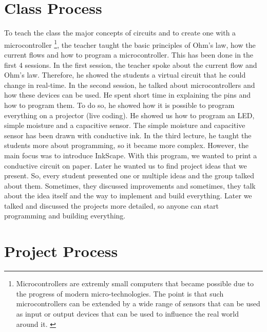 \documentclass[12pt,twoside,a4paper]{article}
\begin{document}
    \section{Class Process}
    \begin{flushleft}
        To teach the class the major concepts of circuits and to create one with a microcontroller {\footnote{\label{foot:
        microcontroller} Microcontrollers are extremly small computers that became possible due to the progress of modern 
        micro-technologies. The point is that such microcontrollers can be extended by a wide range of sensors that can 
        be used as input or output devices that can be used to influence the real world around it. \cite{Schief1997, 
        Dembowski2014}}}, the teacher taught the basic principles of Ohm's law, how the current flows and how to program 
        a microcontroller. This has been done in the first 4 sessions.\newline
        In the first session, the teacher spoke about the current flow and Ohm's law. Therefore, he showed the students
        a virtual circuit that he could change in real-time.\newline
        In the second session, he talked about microcontrollers and how these devices can be used. He spent short
        time in explaining the pins and how to program them. To do so, he showed how it is possible to program
        everything on a projector (live coding). He showed us how to program an LED, simple moisture and 
        a capacitive sensor. The simple moisture and capacitive sensor has been drawn with conductive ink.\newline
        In the third lecture, he taught the students more about programming, so it became more complex. However, 
        the main focus was to introduce InkScape. With this program, we wanted to print a conductive circuit on paper.\newline
        Later he wanted us to find project ideas that we present. So, every student presented one or multiple ideas and
        the group talked about them. Sometimes, they discussed improvements and sometimes, they talk about the idea itself
        and the way to implement and build everything.
        Later we talked and discussed the projects more detailed, so anyone can start programming and building everything.
    \end{flushleft}

    \section{Project Process}
\end{document}
